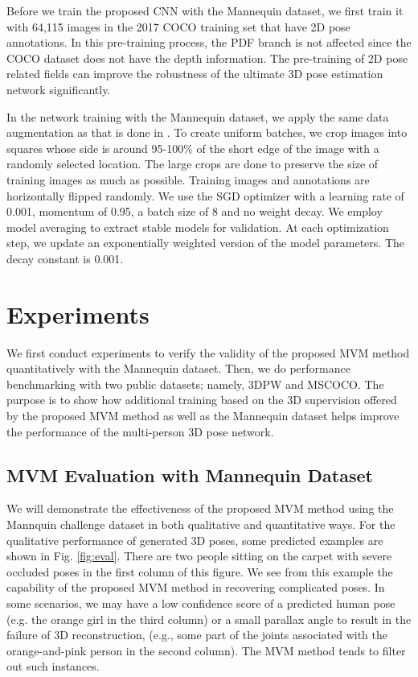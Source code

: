 \documentclass{article}
\begin{document}
Before we train the proposed CNN with the Mannequin dataset, we first
train it with 64,115 images in the 2017 COCO training set that have 2D
pose annotations. In this pre-training process, the PDF branch is not
affected since the COCO dataset does not have the depth information.
The pre-training of 2D pose related fields can improve the robustness of
the ultimate 3D pose estimation network significantly. 

In the network training with the Mannequin dataset, we apply the same
data augmentation as that is done in \cite{kreiss2019pifpaf}. To create
uniform batches, we crop images into squares whose side is around
95-100\% of the short edge of the image with a randomly selected
location. The large crops are done to preserve the size of training
images as much as possible.  Training images and annotations are
horizontally flipped randomly. We use the SGD optimizer with a learning
rate of 0.001, momentum of 0.95, a batch size of 8 and no weight decay. We
employ model averaging to extract stable models for validation. At each
optimization step, we update an exponentially weighted version of the
model parameters. The decay constant is 0.001. 

\section{Experiments}\label{sec:experiments}

We first conduct experiments to verify the validity of the proposed MVM
method quantitatively with the Mannequin dataset.  Then, we do
performance benchmarking with two public datasets; namely, 3DPW and
MSCOCO. The purpose is to show how additional training based on the 3D
supervision offered by the proposed MVM method as well as the Mannequin
dataset helps improve the performance of the multi-person 3D pose
network. 

\subsection{MVM Evaluation with Mannequin Dataset}

We will demonstrate the effectiveness of the proposed MVM method using
the Mannquin challenge dataset in both qualitative and quantitative
ways.  For the qualitative performance of generated 3D poses, some
predicted examples are shown in Fig. \ref{fig:eval}.  There are two
people sitting on the carpet with severe occluded poses in the first
column of this figure.  We see from this example the capability of the
proposed MVM method in recovering complicated poses. In some scenarios,
we may have a low confidence score of a predicted human pose (e.g. the
orange girl in the third column) or a small parallax angle to result in
the failure of 3D reconstruction, (e.g., some part of the joints
associated with the orange-and-pink person in the second column).  The
MVM method tends to filter out such instances. 
\end{document}
